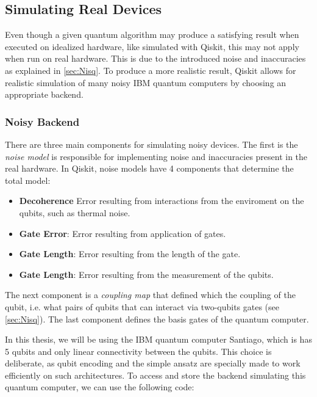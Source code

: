 \subsection{Simulating Real Devices}\label{sec:Simulating Real Devices}

Even though a given quantum algorithm may produce a satisfying result when executed on idealized hardware, like simulated with Qiskit, this may not apply when run on real hardware. This is due to the introduced noise and inaccuracies as explained in \autoref{sec:Nisq}. To produce a more realistic result, Qiskit allows for realistic simulation of many noisy IBM quantum computers by choosing an appropriate backend. 

\subsubsection*{Noisy Backend}

There are three main components for simulating noisy devices. The first is the \emph{noise model} is responsible for implementing noise and inaccuracies present in the real hardware. In Qiskit, noise models have 4 components that determine the total model:

\begin{itemize}
    \item \textbf{Decoherence} Error resulting from interactions from the enviroment on the qubits, such as thermal noise.
    \item \textbf{Gate Error}: Error resulting from application of gates.
    \item \textbf{Gate Length}: Error resulting from the length of the gate.
    \item \textbf{Gate Length}: Error resulting from the measurement of the qubits. 
\end{itemize}

The next component is a \emph{coupling map} that defined which the coupling of the qubit, i.e. what pairs of qubits that can interact via two-qubits gates (see \autoref{sec:Nisq}). The last component defines the basis gates of the quantum computer. 

In this thesis, we will be using the IBM quantum computer Santiago, which is has 5 qubits and only linear connectivity between the qubits. This choice is deliberate, as qubit encoding and the simple ansatz are specially made to work efficiently on such architectures. To access and store the backend simulating this quantum computer, we can use the following code:

